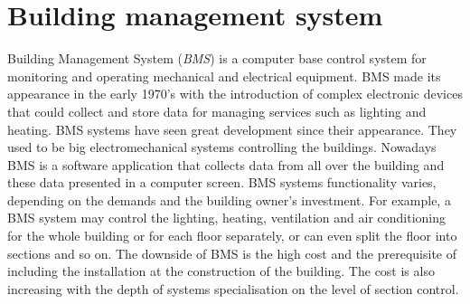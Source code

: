 \documentclass[12pt,a4paper]{report}
\begin{document}
\section{Building management system}
Building Management System (\textit{BMS}) is a computer base control system for monitoring and operating mechanical and electrical equipment. BMS made its appearance in the early 1970's with the introduction of complex electronic devices that could collect and store data for managing services such as lighting and heating. BMS systems have seen great development since their appearance. They used to be big electromechanical systems controlling the buildings. Nowadays BMS is a software application that collects data from all over the building and these data presented in a computer screen. BMS systems functionality varies, depending on the demands and the building owner's investment. For example, a BMS system may control the lighting, heating, ventilation and air conditioning for the whole building or for each floor separately, or can even split the floor into sections and so on. The downside of BMS is the high cost and the prerequisite of including the installation at the construction of the building. The cost is also increasing with the depth of systems specialisation on the level of section control.\cite{website:bms}
%
\end{document}
